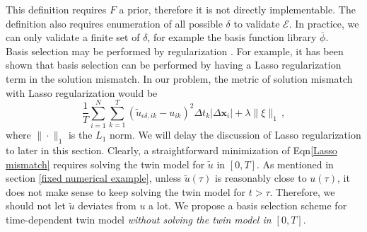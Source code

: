 \documentclass[a4paper,onecolumn]{article}
\theoremstyle{remark}
\begin{document}
\noindent This definition requires $F$ a prior, therefore it is not directly implementable.
The definition also requires enumeration of all possible $\delta$ to validate $\mathcal{E}$.
In practice, we can only validate a finite set of $\delta$, for example the basis function library
$\bar{\phi}$.
\\

\noindent Basis selection may be performed by regularization \cite{Lasso variable selection,
Critical review of variable selection}. 
For example, it has been shown that basis selection can be performed by having a
Lasso regularization term in the solution mismatch. In our problem, the metric of
solution mismatch with Lasso regularization would be
\begin{equation}
    \frac{1}{T}
    \sum_{i=1}^{N}\sum_{k=1}^{T} \left(\tilde{u}_{\epsilon\delta, ik} - u_{ik}\right)^2 \Delta t_k
    \left| \Delta \mathbf{x}_i \right|
    + \lambda \|\xi\|_1\,,
    \label{Lasso mismatch}
\end{equation}
where $\|\cdot\|_1$ is the $L_1$ norm. 
We will delay the discussion of Lasso regularization to later in this section. 
Clearly, a straightforward minimization of Eqn\eqref{Lasso mismatch} requires solving the twin model 
for $\tilde{u}$ in $[0,T]$.
As mentioned in section \ref{fixed numerical example}, unless $\tilde{u}(\tau)$
is reasonably close to $u(\tau)$, it does not make sense to keep solving the twin model for $t>\tau$.
Therefore, we should not let $\tilde{u}$ deviates from $u$ a lot.
We propose a basis selection scheme for time-dependent
twin model \emph{without solving the twin model in $[0,T]$}.\\
\end{document}
